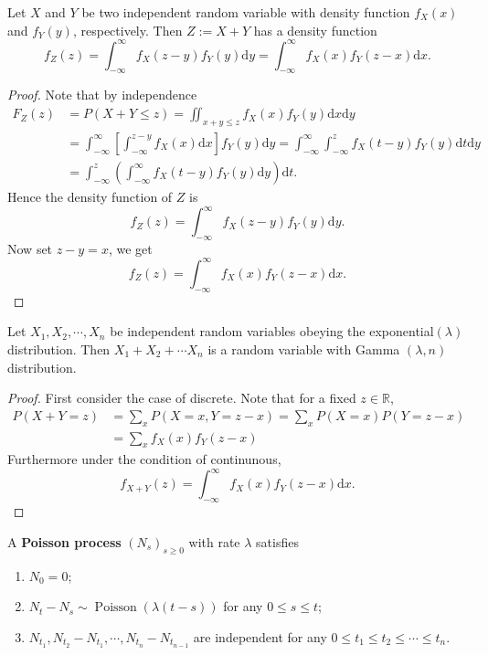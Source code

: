 \documentclass[11pt,singlecolumn, openany, citestyle=authoryear]{elegantbook}
\begin{document}
\begin{CJK}{UTF8}{gbsn}
\begin{theorem}[Convolution]
    Let $X$ and $Y$ be two independent random variable with density function $f_X(x)$ and 
    $f_Y(y)$, respectively. Then $Z:=X+Y$ has a density function 
    \begin{equation}
        f_Z(z)=\int_{-\infty}^\infty f_X(z-y)f_Y(y)\mathrm{d}y=\int_{-\infty}^\infty f_X(x)f_Y(z-x)\mathrm{d}x.
    \end{equation}   
\end{theorem}
\begin{proof}
    Note that by independence
    \begin{align*}
        F_Z(z)&=P(X+Y\leqslant z)=\iint_{x+y\leqslant z}f_X(x)f_Y(y)\mathrm{d}x\mathrm{d}y\\
        &=\int_{-\infty}^\infty \left[\int_{-\infty}^{z-y}f_X(x)\mathrm{d}x\right] f_Y(y)\mathrm{d}y =
        \int_{-\infty}^\infty \int_{-\infty}^{z}f_X(t-y) f_Y(y)\mathrm{d}t \mathrm{d}y \\
        &=\int_{-\infty}^z \left(\int_{-\infty}^\infty f_X(t-y)f_Y(y)\mathrm{d}y\right)\mathrm{d}t.
    \end{align*}
    Hence the density function of $Z$ is 
    $$
    f_Z(z)=\int_{-\infty}^\infty f_X(z-y)f_Y(y)\mathrm{d}y.
    $$
    Now set $z-y=x$, we get 
    $$
    f_Z(z)=\int_{-\infty}^\infty f_X(x)f_Y(z-x)\mathrm{d}x.
    $$
\end{proof}

\begin{proposition}
    Let $X_1,X_2,\cdots,X_n$ be independent random variables obeying the exponential$(\lambda)$ distribution. Then 
    $X_1+X_2+\cdots X_n$ is a random variable with Gamma $(\lambda,n)$ distribution.
\end{proposition}
\begin{proof}
    First consider the case of discrete. Note that for a fixed $z\in\mathbb{R}$,
    \begin{align*}
        P(X+Y=z)&=\sum_x P(X=x,Y=z-x)=\sum_x P(X=x)P(Y=z-x)\\
        &=\sum_x f_X(x)f_Y(z-x)
    \end{align*}    
    Furthermore under the condition of continunous,
    $$
    f_{X+Y}(z) = \int_{-\infty}^{\infty}f_X(x)f_Y(z-x)\mathrm{d}x.
    $$
\end{proof}
\begin{definition}
    A \textbf{Poisson process} $(N_s)_{s\geqslant 0}$ with rate $\lambda$ satisfies
    \begin{enumerate}
        \item $N_0=0$;
        \item $N_t - N_s\sim \operatorname{Poisson}(\lambda(t-s))$ for any 
        $0\leqslant s \leqslant t$;
        \item $N_{t_1},N_{t_2}-N_{t_1},\cdots,N_{t_n}-N_{t_{n-1}}$ are independent for any 
        $0\leqslant t_1 \leqslant t_2 \leqslant \cdots \leqslant t_n$.
    \end{enumerate}
\end{definition}


\end{CJK}
\end{document}
